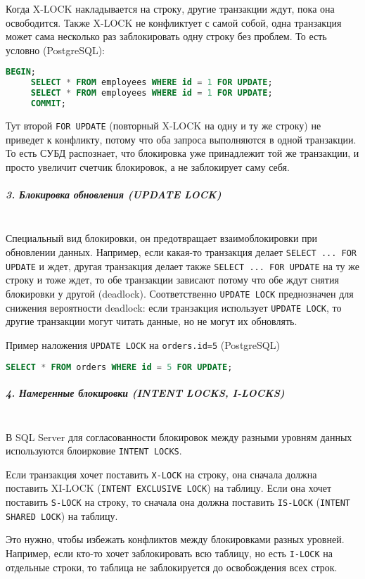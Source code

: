  Когда X-LOCK накладывается на строку, другие транзакции ждут, пока она освободится. Также X-LOCK не конфликтует с самой собой, одна транзакция может сама несколько раз заблокировать одну строку без проблем.
 То есть условно (PostgreSQL):
 \begin{lstlisting}[language=SQL]
     BEGIN;
     SELECT * FROM employees WHERE id = 1 FOR UPDATE;
     SELECT * FROM employees WHERE id = 1 FOR UPDATE;
     COMMIT;    
 \end{lstlisting}
 Тут второй \texttt{FOR UPDATE} (повторный X-LOCK на одну и ту же строку) не приведет к конфликту, потому что оба запроса выполняются в одной транзакции. То есть СУБД распознает, что блокировка уже принадлежит той же транзакции, и просто увеличит счетчик блокировок, а не заблокирует саму себя.
 
 \subparagraph{3. Блокировка обновления (UPDATE LOCK)} ~\\
 
 Специальный вид блокировки, он предотвращает взаимоблокировки при обновлении данных.
 Например, если какая-то транзакция делает \texttt{SELECT ... FOR UPDATE} и ждет, другая транзакция делает также \texttt{SELECT ... FOR UPDATE} на ту же строку и тоже ждет, то обе транзакции зависают потому что обе ждут снятия блокировки у другой (deadlock). 
 Соответственно \texttt{UPDATE LOCK} преднозначен для снижения вероятности deadlock: если транзакция использует \texttt{UPDATE LOCK}, то другие транзакции могут читать данные, но не могут их обновлять.
 
 Пример наложения \texttt{UPDATE LOCK} на \texttt{orders.id=5} (PostgreSQL)
 \begin{lstlisting}[language=SQL]
     SELECT * FROM orders WHERE id = 5 FOR UPDATE;
 \end{lstlisting}
 
 \subparagraph{4. Намеренные блокировки (INTENT LOCKS, I-LOCKS)} ~\\
 
 В SQL Server для согласованности блокировок между разными уровням данных используются блоирковие \texttt{INTENT LOCKS}. \autocite{MicrosoftLearnSQLserverTransLock}
 
 Если транзакция хочет поставить \texttt{X-LOCK} на строку, она сначала должна поставить XI-LOCK (\texttt{INTENT EXCLUSIVE LOCK}) на таблицу. Если она хочет поставить \texttt{S-LOCK} на строку, то сначала она должна поставить \texttt{IS-LOCK} (\texttt{INTENT SHARED LOCK}) на таблицу.
 
 Это нужно, чтобы избежать конфликтов между блокировками разных уровней. Например, если кто-то хочет заблокировать всю таблицу, но есть \texttt{I-LOCK} на отдельные строки, то таблица не заблокируется до освобождения всех строк.
 
